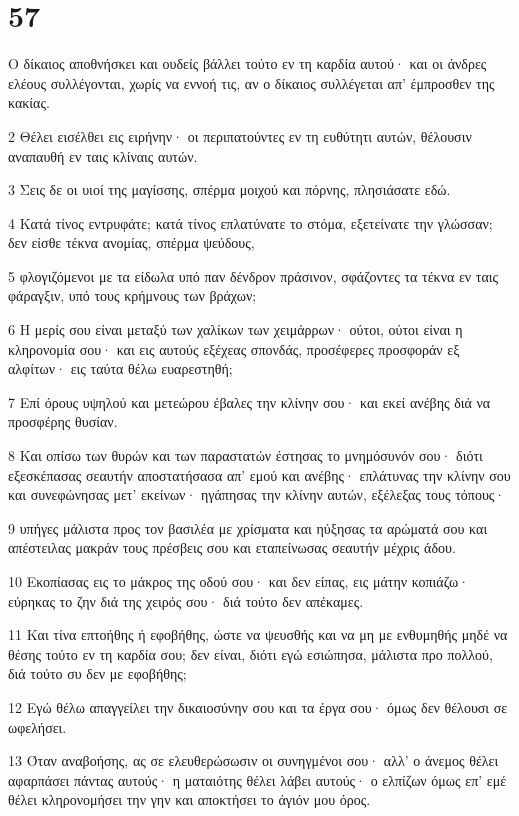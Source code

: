 \chapter{57}

\par Ο δίκαιος αποθνήσκει και ουδείς βάλλει τούτο εν τη καρδία αυτού· και οι άνδρες ελέους συλλέγονται, χωρίς να εννοή τις, αν ο δίκαιος συλλέγεται απ' έμπροσθεν της κακίας.
\par 2 Θέλει εισέλθει εις ειρήνην· οι περιπατούντες εν τη ευθύτητι αυτών, θέλουσιν αναπαυθή εν ταις κλίναις αυτών.
\par 3 Σεις δε οι υιοί της μαγίσσης, σπέρμα μοιχού και πόρνης, πλησιάσατε εδώ.
\par 4 Κατά τίνος εντρυφάτε; κατά τίνος επλατύνατε το στόμα, εξετείνατε την γλώσσαν; δεν είσθε τέκνα ανομίας, σπέρμα ψεύδους,
\par 5 φλογιζόμενοι με τα είδωλα υπό παν δένδρον πράσινον, σφάζοντες τα τέκνα εν ταις φάραγξιν, υπό τους κρήμνους των βράχων;
\par 6 Η μερίς σου είναι μεταξύ των χαλίκων των χειμάρρων· ούτοι, ούτοι είναι η κληρονομία σου· και εις αυτούς εξέχεας σπονδάς, προσέφερες προσφοράν εξ αλφίτων· εις ταύτα θέλω ευαρεστηθή;
\par 7 Επί όρους υψηλού και μετεώρου έβαλες την κλίνην σου· και εκεί ανέβης διά να προσφέρης θυσίαν.
\par 8 Και οπίσω των θυρών και των παραστατών έστησας το μνημόσυνόν σου· διότι εξεσκέπασας σεαυτήν αποστατήσασα απ' εμού και ανέβης· επλάτυνας την κλίνην σου και συνεφώνησας μετ' εκείνων· ηγάπησας την κλίνην αυτών, εξέλεξας τους τόπους·
\par 9 υπήγες μάλιστα προς τον βασιλέα με χρίσματα και ηύξησας τα αρώματά σου και απέστειλας μακράν τους πρέσβεις σου και εταπείνωσας σεαυτήν μέχρις άδου.
\par 10 Εκοπίασας εις το μάκρος της οδού σου· και δεν είπας, εις μάτην κοπιάζω· εύρηκας το ζην διά της χειρός σου· διά τούτο δεν απέκαμες.
\par 11 Και τίνα επτοήθης ή εφοβήθης, ώστε να ψευσθής και να μη με ενθυμηθής μηδέ να θέσης τούτο εν τη καρδία σου; δεν είναι, διότι εγώ εσιώπησα, μάλιστα προ πολλού, διά τούτο συ δεν με εφοβήθης;
\par 12 Εγώ θέλω απαγγείλει την δικαιοσύνην σου και τα έργα σου· όμως δεν θέλουσι σε ωφελήσει.
\par 13 Όταν αναβοήσης, ας σε ελευθερώσωσιν οι συνηγμένοι σου· αλλ' ο άνεμος θέλει αφαρπάσει πάντας αυτούς· η ματαιότης θέλει λάβει αυτούς· ο ελπίζων όμως επ' εμέ θέλει κληρονομήσει την γην και αποκτήσει το άγιόν μου όρος.
